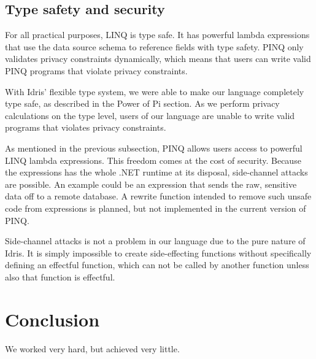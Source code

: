 \documentclass[12pt]{article}
\begin{document}
\subsection{Type safety and security}

For all practical purposes, LINQ is type safe.
It has powerful lambda expressions that use the data source schema to reference fields with type safety.
PINQ only validates privacy constraints dynamically, which means that users can write valid PINQ programs that violate privacy constraints.

With Idris' flexible type system, we were able to make our language completely type safe, as described in the Power of Pi section.
As we perform privacy calculations on the type level, users of our language are unable to write valid programs that violates privacy constraints.

As mentioned in the previous subsection, PINQ allows users access to powerful LINQ lambda expressions.
This freedom comes at the cost of security.
Because the expressions has the whole .NET runtime at its disposal, side-channel attacks are possible.
An example could be an expression that sends the raw, sensitive data off to a remote database.
A rewrite function intended to remove such unsafe code from expressions is planned, but not implemented in the current version of PINQ.

Side-channel attacks is not a problem in our language due to the pure nature of Idris.
It is simply impossible to create side-effecting functions without specifically defining an effectful function, which can not be called by another function unless also that function is effectful.




\section{Conclusion}\label{sec:conclusion}

We worked very hard, but achieved very little.



\end{document}
